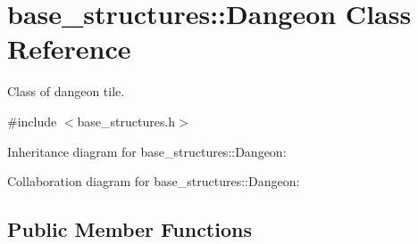 \hypertarget{classbase__structures_1_1Dangeon}{}\section{base\+\_\+structures\+:\+:Dangeon Class Reference}
\label{classbase__structures_1_1Dangeon}


Class of dangeon tile.  




{\ttfamily \#include $<$base\+\_\+structures.\+h$>$}



Inheritance diagram for base\+\_\+structures\+:\+:Dangeon\+:


Collaboration diagram for base\+\_\+structures\+:\+:Dangeon\+:
\subsection*{Public Member Functions}
